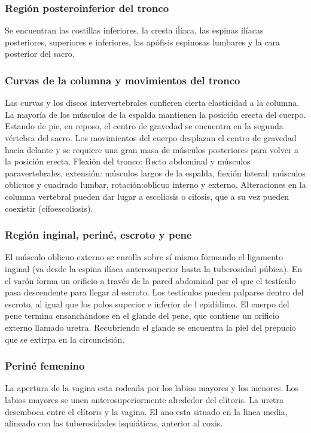 \documentclass[a4paper,12pt]{article} %
\begin{document}
\begin{appendices}
\subsubsection{Región posteroinferior del tronco}
Se encuentran las costillas inferiores, la cresta iĺíaca, las espinas ilíacas posteriores, superiores e inferiores, las apófisis espinosas lumbares y la cara posterior del sacro.

\subsubsection{Curvas de la columna y movimientos del tronco}
Las curvas y los discos intervertebrales confieren cierta elasticidad a la columna. La mayoría de los músculos de la espalda mantienen la posición erecta del cuerpo. Estando de pie, en reposo, el centro de gravedad se encuentra en la segunda vértebra del sacro. Los movimientos del cuerpo desplazan el centro de gravedad hacia delante y se requiere una gran masa de músculos posteriores para volver a la posición erecta. Flexión del tronco: Recto abdominal y músculos paravertebrales, extensión: músculos largos de la espalda, flexión lateral: músculos oblicuos y cuadrado lumbar, rotación:oblicuo interno y externo. Alteraciones en la columna vertebral pueden dar lugar a escoliosis o cifosis, que a su vez pueden coexistir (cifoescoliosis).

\subsubsection{Región inginal, periné, escroto y pene}
El músculo oblicuo externo se enrolla sobre sí mismo formando el ligamento inginal (va desde la espina ilíaca anterosuperior hasta la tuberosidad púbica). En el varón forma un orificio a través de la pared abdominal por el que el testículo pasa descendente para llegar al escroto. Los testículos pueden palparse dentro del escroto, al igual que los polos superior e inferior de l epidídimo. El cuerpo del pene termina ensanchándose en el glande del pene, que contiene un orificio externo llamado uretra. Recubriendo el glande se encuentra la piel del prepucio que se extirpa en la circuncisión.

\subsubsection{Periné femenino}
La apertura de la vagina esta rodeada por los labios mayores y los menores. Los labios mayores se unen anterosuperiormente alrededor del clítoris. La uretra desemboca entre el clítoris y la vagina. El ano esta situado en la linea media, alineado con las tuberosidades isquiáticas, anterior al coxis.



\end{appendices}
\end{document}
